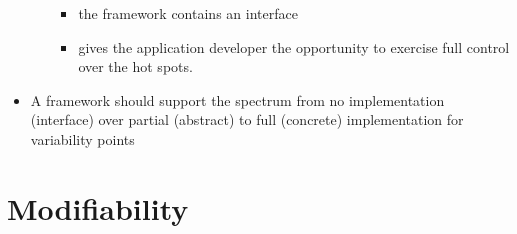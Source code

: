 \documentclass[11pt]{article}
\providecommand{\tightlist}{%
      \setlength{\itemsep}{0pt}\setlength{\parskip}{0pt}}
\begin{document}
\begin{itemize}
\begin{itemize}
    \begin{itemize}
    \tightlist
    \item
      the framework contains an interface
    \item
      gives the application developer the opportunity to exercise full
      control over the hot spots.
    \end{itemize}
  \end{itemize}
\item
  A framework should support the spectrum from no implementation
  (interface) over partial (abstract) to full (concrete) implementation
  for variability points
\end{itemize}

    \hypertarget{modifiability}{%
\section{Modifiability}\label{modifiability}}
\end{document}
